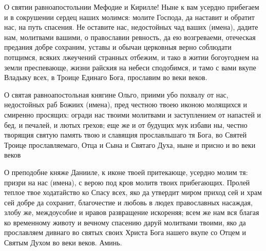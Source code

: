 \begin{mymulticols}



О святии равноапостольнии Мефодие и Кирилле! Ныне к вам усердно прибегаем и в сокрушении сердец наших молимся: молите Господа, да наставит и обратит нас, на путь спасения. Не оставите нас, недостойных чад ваших (имена), дадите нам, молитвами вашими, о православии ревность, да ею возгреваеми, отеческая предания добре сохраним, уставы и обычаи церковныя верно соблюдати  потщимся, всяких лжеучений странных отбежим, и тако в житии богоугоднем на земли преспевающе, жизни райския на небеси сподобимся, и тамо с вами вкупе Владыку всех, в Троице Единаго Бога, прославим во веки веков.

\end{mymulticols}

\mychapterending


\begin{mymulticols}



О святая равноапостольная княгине Ольго, приими убо похвалу от нас, недостойных раб Божиих (имена), пред  честною твоею иконою молящихся и смиренно просящих: огради нас твоими молитвами и заступлением от напастей и бед,  и печалей, и лютых грехов; еще же и от будущих мук избави ны, честно творящия святую память твою и славящия прославльшаго тя Бога, во Святей Троице прославляемаго, Отца и Сына и Святаго Духа, ныне и присно и во веки веков

\end{mymulticols}

\mychapterending


\begin{mymulticols}



О преподобне княже Данииле, к иконе твоей притекающе, усердно молим тя: призри на нас (имена), с верою под  кров молитв твоих прибегающих.  Пролей теплое твое ходатайство ко Спасу всех,  яко да утвердит миром приход сей и храм сей добре да сохранит, благочестие и любовь в людех православных насаждая, злобу же, междоусобие и нравов развращение  искореняя; всем же нам вся благая ко временному животу и вечному спасению даруй молитвами твоими, яко да прославляем дивнаго во святых своих Христа Бога нашего вкупе со Отцем и Святым Духом во веки веков. Аминь.

\end{mymulticols}

